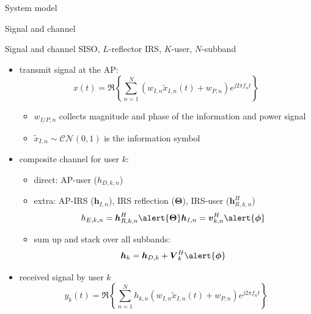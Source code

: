 \documentclass[9pt]{beamer}
\begin{document}
\begin{section}{System model}
	\begin{subsection}{Signal and channel}
		\begin{frame}{Signal and channel}
			SISO, $L$-reflector IRS, $K$-user, $N$-subband
			\begin{itemize}
				\item transmit signal at the AP:
				\begin{equation}
					x(t)=\Re\left\{\sum_{n=1}^N\left({w_{I,n}\tilde{x}_{I,n}(t)}+w_{P,n}\right){e^{j2{\pi}{f_n}{t}}}\right\}
				\end{equation}
				\begin{itemize}
					\item $w_{I/P,n}$ collects magnitude and phase of the information and power signal
					\item $\tilde{x}_{I,n}\sim\mathcal{CN}(0,1)$ is the information symbol
				\end{itemize}
				\item composite channel for user $k$:
				\begin{itemize}
					\item direct: AP-user ($h_{D,k,n}$)
					\item extra: AP-IRS ($\boldsymbol{h}_{I,n}$), \alert{IRS reflection ($\boldsymbol{\Theta}$)}, IRS-user ($\boldsymbol{h}_{R,k,n}^H$)
					\begin{equation}
						h_{E,k,n} = \boldsymbol{h}_{R,k,n}^H \alert{\boldsymbol{\Theta}} \boldsymbol{h}_{I,n} = \boldsymbol{v}_{k,n}^H \alert{\boldsymbol{\phi}}
					\end{equation}
					\item sum up and stack over all subbands:
					\begin{equation}
						\boldsymbol{h}_k = \boldsymbol{h}_{D,k} + \boldsymbol{V}_k^H \alert{\boldsymbol{\phi}}
					\end{equation}
				\end{itemize}
				\item received signal by user $k$
				\begin{equation}
					y_k(t)=\Re\left\{\sum_{n=1}^N{h_{{k,n}}}\left({w_{I,n}\tilde{x}_{I,n}(t)}+w_{P,n}\right){e^{j2{\pi}{f_n}{t}}}\right\}
				\end{equation}
			\end{itemize}
		\end{frame}
	\end{subsection}


\end{section}
\end{document}
